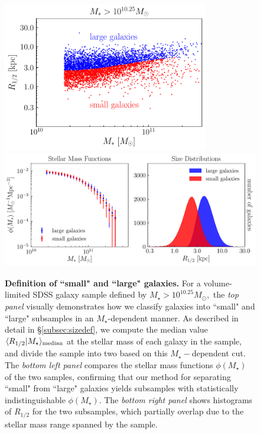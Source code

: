 \documentclass[usenatbib,usegraphicx,letterpaper]{mn2e}
\newcommand{\rhalf}{R_{1/2}}
\newcommand{\mstar}{M_{\star}}
\newcommand{\median}[2]{\langle{#1}\vert{#2}\rangle_{\rm median}}
\begin{document}
\begin{figure}
\centering
\includegraphics[width=9cm]{FIGS/sdss_size_vs_mstar_scatter.pdf}
\includegraphics[width=\textwidth]{FIGS/sdss_small_large_sample_definitions.pdf}
\caption{
{\bf Definition of ``small" and ``large" galaxies.} For a volume-limited SDSS galaxy sample defined by $M_{\star}>10^{10.25}M_{\odot},$ the {\em top panel} visually demonstrates how we classify galaxies into ``small" and ``large" subsamples in an $\mstar$-dependent manner. As described in detail in \S\ref{subsec:sizedef}, we compute the median value $\median{\rhalf}{\mstar}$ at the stellar mass of each galaxy in the sample, and divide the sample into two based on this $\mstar-$dependent cut. The {\em bottom left panel} compares the stellar mass functions $\phi(\mstar)$ of the two samples, confirming that our method for separating ``small" from ``large" galaxies yields subsamples with statistically indistinguishable $\phi(\mstar)$. The {\em bottom right panel} shows histograms of $\rhalf$ for the two subsamples, which partially overlap due to the stellar mass range spanned by the sample.
}
\label{fig:sizedefinition}
\end{figure}
\end{document}

